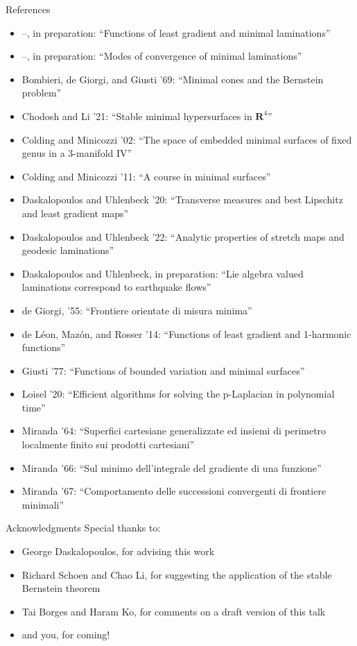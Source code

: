 \documentclass[10pt]{beamer}
\newcommand{\RR}{\mathbf{R}}
\begin{document}
\begin{frame}[allowframebreaks]{References}
\begin{itemize}
\item --, in preparation: ``Functions of least gradient and minimal laminations''
\item --, in preparation: ``Modes of convergence of minimal laminations''
\item Bombieri, de Giorgi, and Giusti '69: ``Minimal cones and the Bernstein problem''
\item Chodosh and Li '21: ``Stable minimal hypersurfaces in $\RR^4$''
\item Colding and Minicozzi '02: ``The space of embedded minimal surfaces of fixed genus in a 3-manifold IV''
\item Colding and Minicozzi '11: ``A course in minimal surfaces''
\item Daskalopoulos and Uhlenbeck '20: ``Transverse measures and best Lipschitz and least gradient maps''
\item Daskalopoulos and Uhlenbeck '22: ``Analytic properties of stretch maps and geodesic laminations''
\item Daskalopoulos and Uhlenbeck, in preparation: ``Lie algebra valued laminations correspond to earthquake flows''
\item de Giorgi, '55: ``Frontiere orientate di misura minima''
\item de L\'eon, Maz\'on, and Rosser '14: ``Functions of least gradient and 1-harmonic functions''
\item Giusti '77: ``Functions of bounded variation and minimal surfaces''
\item Loisel '20: ``Efficient algorithms for solving the p-Laplacian in polynomial time''
\item Miranda '64: ``Superfici cartesiane generalizzate ed insiemi di perimetro localmente finito sui prodotti cartesiani''
\item Miranda '66: ``Sul minimo dell'integrale del gradiente di una funzione''
\item Miranda '67: ``Comportamento delle successioni convergenti di frontiere minimali''
\end{itemize}
\end{frame}

\begin{frame}{Acknowledgments}
Special thanks to:
\begin{itemize}
\item George Daskalopoulos, for advising this work 
\item Richard Schoen and Chao Li, for suggesting the application of the stable Bernstein theorem
\item Tai Borges and Haram Ko, for comments on a draft version of this talk
\item and you, for coming!
\end{itemize}
\end{frame}
\end{document}
